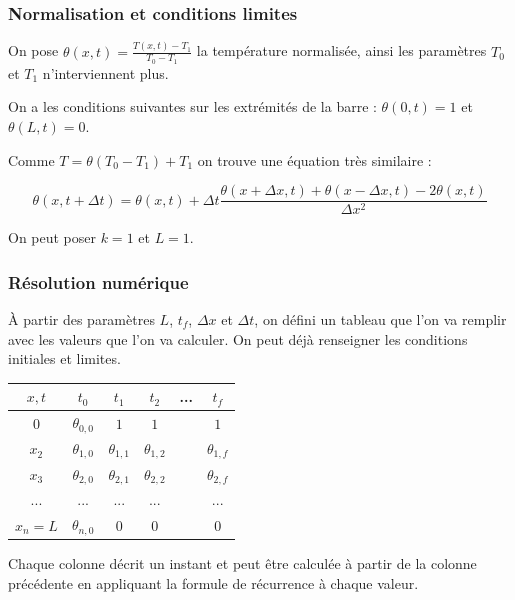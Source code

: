\documentclass{beamer}
\begin{document}
    \begin{frame}
    \frametitle{Normalisation et conditions limites}


    On pose $\theta(x,t) = \frac{T(x,t) -T_1}{T_0 - T_1}$ la température normalisée,
    ainsi les paramètres $T_0$ et $T_1$ n'interviennent plus.

    \medskip

    On a les conditions suivantes sur les extrémités de la barre : $\theta(0, t) = 1$ et $\theta(L, t) = 0$.

    \medskip

    Comme $T = \theta(T_0 - T_1) + T_1$ on trouve une équation très similaire :

    $$\boxed{\theta(x, t + \Delta t) = \theta(x, t) + \Delta t \frac{\theta(x+ \Delta x, t) + \theta(x-\Delta x, t) -2\theta(x, t)}{\Delta x ^2 }}$$

    \medskip

    On peut poser $k = 1$ et $L = 1$.


    \end{frame}


    \begin{frame}
    \frametitle{Résolution numérique}

    À partir des paramètres $L$, $t_f$, $\Delta x$ et $\Delta t$, on défini un tableau que l'on va remplir avec les valeurs que l'on va calculer. On peut déjà renseigner les conditions initiales et limites.

    \begin{center}
	    \begin{tabular}{ |c|c|c|c|c|c| }
	     \hline
	     $x, t$ & $t_0$ & $t_1$ & $t_2$ & ... & $t_f$ \\
	     \hline
	     $0$   & $\theta_{0,0}$ & $1$ & $1$ &  & $1$\\
	     $x_2$ & $\theta_{1,0}$ & $\theta_{1,1}$ & $\theta_{1,2}$ &  & $\theta_{1,f}$\\
	     $x_3$ & $\theta_{2,0}$ & $\theta_{2,1}$ & $\theta_{2,2}$ &  & $\theta_{2,f}$\\
	     ... & ... & ... & ... &  & ... \\
	     $x_n = L$ &   $\theta_{n,0}$ & $0$ & $0$ &  & $0$\\
	     \hline
	    \end{tabular}
  	\end{center}

  	Chaque colonne décrit un instant et peut être calculée à partir de la colonne précédente en appliquant la formule de récurrence à chaque valeur.

    \end{frame}
\end{document}
